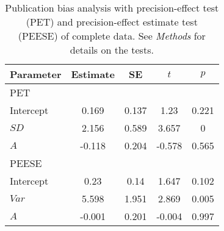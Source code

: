 \begin{table}[ht]
\centering
\caption{Publication bias analysis with precision-effect test (PET) and precision-effect estimate test (PEESE) of complete data. See \textit{Methods} for details on the tests.} 
\label{tab:PET-PEESE}
\begin{tabular}{lcccc}
  \hline
Parameter & Estimate & SE & $t$ & $p$ \\ 
  \hline
PET &  &  &  &  \\ 
  Intercept & 0.169 & 0.137 & 1.23 & 0.221 \\ 
  $SD$ & 2.156 & 0.589 & 3.657 & 0 \\ 
  $A$ & -0.118 & 0.204 & -0.578 & 0.565 \\ 
  PEESE &  &  &  &  \\ 
  Intercept & 0.23 & 0.14 & 1.647 & 0.102 \\ 
  $Var$ & 5.598 & 1.951 & 2.869 & 0.005 \\ 
  $A$ & -0.001 & 0.201 & -0.004 & 0.997 \\ 
   \hline
\end{tabular}
\end{table}
